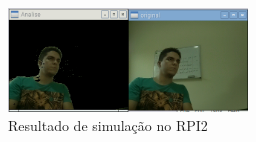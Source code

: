 \documentclass[conference]{IEEEtran}
\begin{document}
\begin{figure}[!t]
\centering
\includegraphics[width=2.5in]{Screen_RPI_01}
\caption{Resultado de simulação no RPI2}
\label{fig:sim_rpi}
\end{figure}


%
%



%
%
\end{document}
